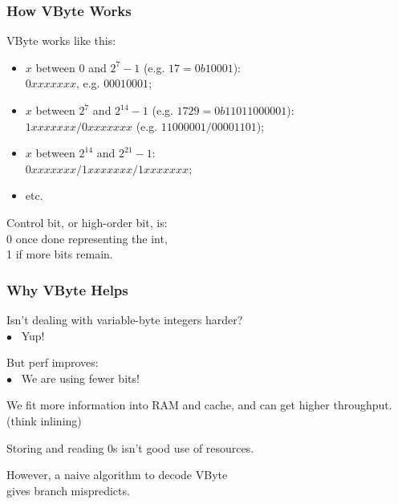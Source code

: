 \begin{frame}
\frametitle{How VByte Works}


VByte works like this:

\begin{itemize}
\item $x$ between 0 and $2^7-1$ (e.g. $17 = 0b10001$):\\
\hspace*{1em}$0xxx xxxx$, e.g. $0001 0001$;
\item $x$ between $2^7$ and $2^{14}-1$ (e.g. $1729 = 0b110 11000001$):\\
\hspace*{1em}                   $1xxx xxxx/0xxx xxxx$ (e.g. $1100 0001/0000 1101$);\\
\item $x$ between $2^{14}$ and $2^{21}-1$: \\
\hspace*{1em}$0xxx xxxx/1xxx xxxx/1xxx xxxx$;
\item etc.
\end{itemize}

Control bit, or high-order bit, is:\\
\hspace*{2em}0 once done representing the int,\\
\hspace*{2em}1 if more bits remain.


\end{frame}



\begin{frame}
\frametitle{Why VByte Helps}


Isn't dealing with variable-byte integers harder?\\
\hspace*{2em} $\bullet$~ Yup!

But perf improves: \\
\hspace*{2em} $\bullet$~  We are using fewer bits! 

We fit more information into RAM and
cache, and can get higher throughput. (think inlining)

Storing and reading 0s isn't good use of resources. 

However, a naive algorithm to decode VByte \\
gives branch mispredicts.

\end{frame}

